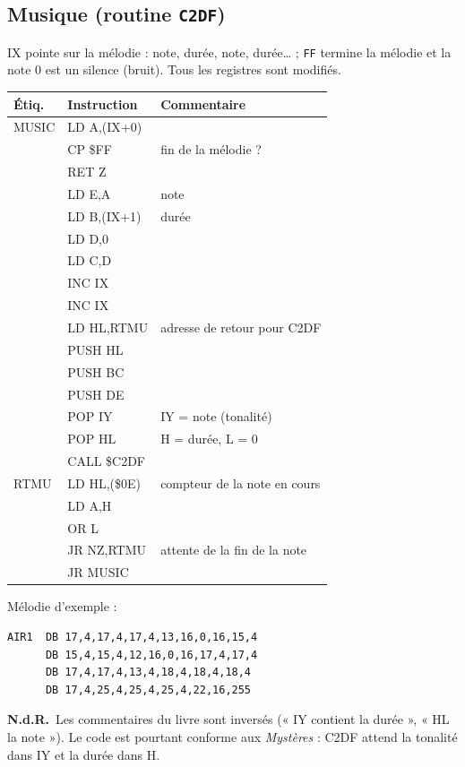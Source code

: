\documentclass[a4paper,10pt]{article}
\makeatletter
\newcommand{\hex}[1]{\texttt{#1}}
\newcommand{\nota}[1]{\textcolor{red!60!black}{\small\textbf{N.d.R.}~#1}}
\newenvironment{src}
  {\small\begin{longtable}{@{}>{\ttfamily}l>{\ttfamily}l>{\raggedright\arraybackslash}p{8.6cm}@{}}
   \toprule
   \normalfont\bfseries Étiq. & \normalfont\bfseries Instruction & \textbf{Commentaire}\\
   \midrule\endhead
   \bottomrule\endfoot}
  {\end{longtable}}
\makeatother
\begin{document}
\subsection{Musique (routine \hex{C2DF})}
IX pointe sur la mélodie : note, durée, note, durée\dots{} ; \hex{FF}
termine la mélodie et la note 0 est un silence (bruit). Tous les registres
sont modifiés.
\begin{src}
MUSIC & LD A,(IX+0) & \\
 & CP \$FF & fin de la mélodie ? \\
 & RET Z & \\
 & LD E,A & note \\
 & LD B,(IX+1) & durée \\
 & LD D,0 & \\
 & LD C,D & \\
 & INC IX & \\
 & INC IX & \\
 & LD HL,RTMU & adresse de retour pour C2DF \\
 & PUSH HL & \\
 & PUSH BC & \\
 & PUSH DE & \\
 & POP IY & IY = note (tonalité) \\
 & POP HL & H = durée, L = 0 \\
 & CALL \$C2DF & \\
RTMU & LD HL,(\$0E) & compteur de la note en cours \\
 & LD A,H & \\
 & OR L & \\
 & JR NZ,RTMU & attente de la fin de la note \\
 & JR MUSIC & \\
\end{src}
Mélodie d'exemple :
\begin{verbatim}
AIR1  DB 17,4,17,4,17,4,13,16,0,16,15,4
      DB 15,4,15,4,12,16,0,16,17,4,17,4
      DB 17,4,17,4,13,4,18,4,18,4,18,4
      DB 17,4,25,4,25,4,25,4,22,16,255
\end{verbatim}
\nota{Les commentaires du livre sont inversés (« IY contient la durée »,
« HL la note »). Le code est pourtant conforme aux \emph{Mystères} : C2DF
attend la tonalité dans IY et la durée dans H.}
\end{document}
